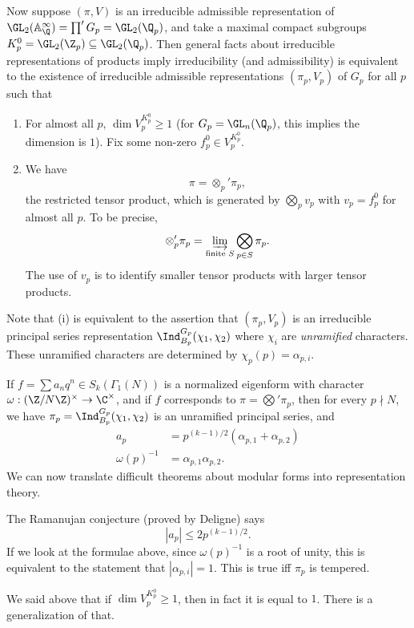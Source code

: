 \documentclass[a4paper]{article}
\newcommand\A{\mathbb{A}}
\begin{document}
Now suppose $(\pi, V)$ is an irreducible admissible representation of $\GL_2(\A_\Q^\infty) = \prod' G_p = \GL_2(\Q_p)$, and take a maximal compact subgroups $K_p^0 = \GL_2(\Z_p) \subseteq \GL_2(\Q_p)$. Then general facts about irreducible representations of products imply irreducibility (and admissibility) is equivalent to the existence of irreducible admissible representations $(\pi_p, V_p)$ of $G_p$ for all $p$ such that
\begin{enumerate}
  \item For almost all $p$, $\dim V_p^{K_p^0} \geq 1$ (for $G_p = \GL_n(\Q_p)$, this implies the dimension is $1$). Fix some non-zero $f_p^0 \in V_p^{K_p^0}$.
  \item We have
    \[
      \pi = \otimes_p' \pi_p,
    \]
    the restricted tensor product, which is generated by $\bigotimes_p v_p$ with $v_p = f_p^0$ for almost all $p$. To be precise,
    \[
      \otimes_p' \pi_p = \varinjlim_{\text{finite }S} \bigotimes_{p \in S} \pi_p.
    \]
    The use of $v_p$ is to identify smaller tensor products with larger tensor products.
\end{enumerate}

Note that (i) is equivalent to the assertion that $(\pi_p, V_p)$ is an irreducible principal series representation $\Ind_{B_p}^{G_p} (\chi_1, \chi_2)$ where $\chi_i$ are \emph{unramified} characters. These unramified characters are determined by $\chi_p(p) = \alpha_{p, i}$.

If $f = \sum a_n q^n \in S_k(\Gamma_1(N))$ is a normalized eigenform with character $\omega: (\Z/N\Z)^\times \to \C^\times$, and if $f$ corresponds to $\pi = \bigotimes' \pi_p$, then for every $p \nmid N$, we have $\pi_p = \Ind_{B_p}^{G_p}(\chi_1, \chi_2)$ is an unramified principal series, and
\begin{align*}
  a_p &= p^{(k - 1)/2} (\alpha_{p, 1} + \alpha_{p, 2})\\
  \omega(p)^{-1} &= \alpha_{p, 1} \alpha_{p, 2}.
\end{align*}
We can now translate difficult theorems about modular forms into representation theory.
\begin{eg}
  The Ramanujan conjecture (proved by Deligne) says
  \[
    |a_p| \leq 2 p^{(k - 1)/2}.
  \]
  If we look at the formulae above, since $\omega(p)^{-1}$ is a root of unity, this is equivalent to the statement that $|\alpha_{p, i}| = 1$. This is true iff $\pi_p$ is tempered.
\end{eg}

We said above that if $\dim V_p^{K_p^0} \geq 1$, then in fact it is equal to $1$. There is a generalization of that.
\end{document}
